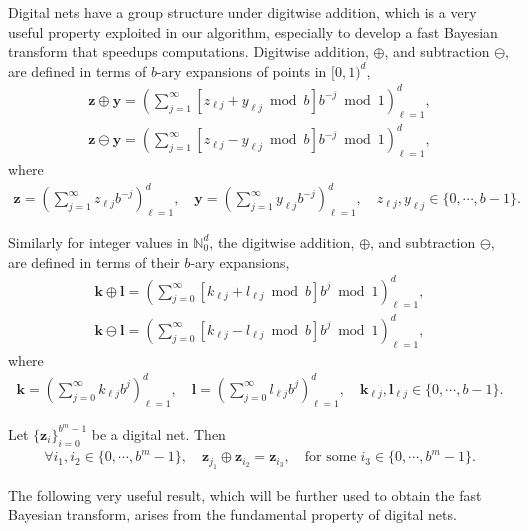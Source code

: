 \documentclass{svjour3}                     %
\newcommand{\bm}[1]{\boldsymbol{#1}}
\newcommand{\naturals}{\mathbb{N}}
\newcommand{\vk}{\bm{k}}
\newcommand{\vl}{\bm{l}}
\newcommand{\vy}{\bm{y}}
\newcommand{\vz}{\bm{z}}
\begin{document}
Digital nets have a group structure under digitwise addition, which is a very useful property exploited in our algorithm, especially to develop a fast Bayesian transform that speedups computations.
Digitwise addition, $\oplus$, and subtraction $\ominus$, are defined in terms of $b$-ary expansions of points in $[0, 1)^d$,
\begin{align*}
\vz \oplus \vy = \left( \sum_{j=1}^\infty [z_{\ell j} + y_{\ell j} \bmod b] b^{-j} \bmod 1 \right)_{\ell=1}^d,
\\
\vz \ominus \vy = \left( \sum_{j=1}^\infty [z_{\ell j} - y_{\ell j} \bmod b] b^{-j} \bmod 1 \right)_{\ell=1}^d,
\end{align*}
where
\begin{align*}
\vz = \left( \sum_{j=1}^{\infty} z_{\ell j}b^{-j}\right)_{\ell=1}^d, \quad
\vy = \left( \sum_{j=1}^{\infty} y_{\ell j}b^{-j}\right)_{\ell=1}^d, \quad
z_{\ell j}, y_{\ell j} \in \{0,\cdots,b-1\}.
\end{align*}



Similarly for integer values in $\naturals_0^d$, the digitwise addition, $\oplus$, and subtraction $\ominus$, are defined in terms of their $b$-ary expansions,
\begin{align*}
\vk \oplus \vl = \left( \sum_{j=0}^\infty [k_{\ell j} + l_{\ell j} \bmod b] b^{j} \bmod 1 \right)_{\ell=1}^d,
\\
\vk \ominus \vl = \left( \sum_{j=0}^\infty [k_{\ell j} - l_{\ell j} \bmod b] b^{j} \bmod 1 \right)_{\ell=1}^d,
\end{align*}
where
\begin{align*}
\vk = \left( \sum_{j=0}^{\infty} k_{\ell j}b^{j}\right)_{\ell=1}^d, \quad
\vl = \left( \sum_{j=0}^{\infty} l_{\ell j}b^{j}\right)_{\ell=1}^d, \quad
\vk_{\ell j}, \vl_{\ell j} \in \{0,\cdots,b-1\}.
\end{align*}

Let $\{\vz_i\}_{i=0}^{b^m-1}$ be a digital net. Then
\begin{align*}
\forall i_1, i_2 \in \{0,\cdots,b^m-1\}, \quad \vz_{j_1} \oplus \vz_{i_2} = \vz_{i_3}, \quad \text{for some} \; i_3 \in \{0,\cdots,b^m-1\}.
\end{align*}

The following very useful result, which will be further used to obtain the fast Bayesian transform, arises from the fundamental property of digital nets.
\end{document}
